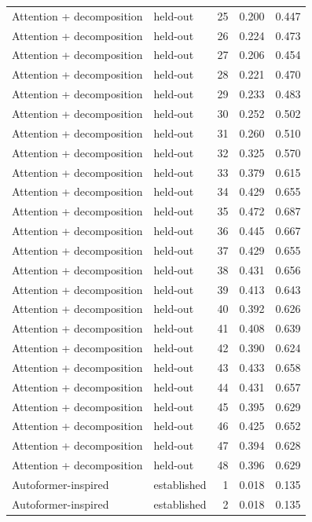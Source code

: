 \begin{tabular}{llrrr}
Attention + decomposition & held-out & 25 & 0.200 & 0.447 \\
Attention + decomposition & held-out & 26 & 0.224 & 0.473 \\
Attention + decomposition & held-out & 27 & 0.206 & 0.454 \\
Attention + decomposition & held-out & 28 & 0.221 & 0.470 \\
Attention + decomposition & held-out & 29 & 0.233 & 0.483 \\
Attention + decomposition & held-out & 30 & 0.252 & 0.502 \\
Attention + decomposition & held-out & 31 & 0.260 & 0.510 \\
Attention + decomposition & held-out & 32 & 0.325 & 0.570 \\
Attention + decomposition & held-out & 33 & 0.379 & 0.615 \\
Attention + decomposition & held-out & 34 & 0.429 & 0.655 \\
Attention + decomposition & held-out & 35 & 0.472 & 0.687 \\
Attention + decomposition & held-out & 36 & 0.445 & 0.667 \\
Attention + decomposition & held-out & 37 & 0.429 & 0.655 \\
Attention + decomposition & held-out & 38 & 0.431 & 0.656 \\
Attention + decomposition & held-out & 39 & 0.413 & 0.643 \\
Attention + decomposition & held-out & 40 & 0.392 & 0.626 \\
Attention + decomposition & held-out & 41 & 0.408 & 0.639 \\
Attention + decomposition & held-out & 42 & 0.390 & 0.624 \\
Attention + decomposition & held-out & 43 & 0.433 & 0.658 \\
Attention + decomposition & held-out & 44 & 0.431 & 0.657 \\
Attention + decomposition & held-out & 45 & 0.395 & 0.629 \\
Attention + decomposition & held-out & 46 & 0.425 & 0.652 \\
Attention + decomposition & held-out & 47 & 0.394 & 0.628 \\
Attention + decomposition & held-out & 48 & 0.396 & 0.629 \\
Autoformer-inspired & established & 1 & 0.018 & 0.135 \\
Autoformer-inspired & established & 2 & 0.018 & 0.135 \\

\end{tabular}
